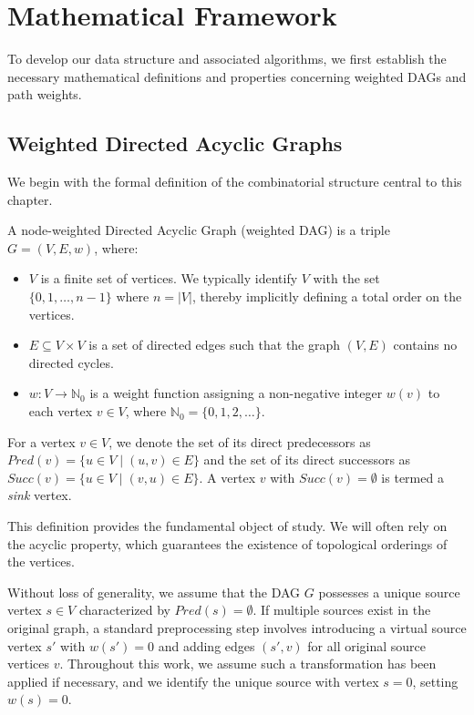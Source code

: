 \section{Mathematical Framework}
\label{sec:dag_defs}

To develop our data structure and associated algorithms, we first establish the necessary mathematical definitions and properties concerning weighted DAGs and path weights.

\subsection*{Weighted Directed Acyclic Graphs}
\label{subsec:dag_def}

We begin with the formal definition of the combinatorial structure central to this chapter.

\begin{definition}
    \label{def:weighted_dag}
    A node-weighted Directed Acyclic Graph (weighted DAG) is a triple $G = (V, E, w)$, where:
    \begin{itemize}
        \item $V$ is a finite set of vertices. We typically identify $V$ with the set $\{0, 1, \dots, n-1\}$ where $n = |V|$, thereby implicitly defining a total order on the vertices.
        \item $E \subseteq V \times V$ is a set of directed edges such that the graph $(V, E)$ contains no directed cycles.
        \item $w: V \to \mathbb{N}_0$ is a weight function assigning a non-negative integer $w(v)$ to each vertex $v \in V$, where $\mathbb{N}_0 = \{0, 1, 2, \dots\}$.
    \end{itemize}
    For a vertex $v \in V$, we denote the set of its direct predecessors as $Pred(v) = \{u \in V \mid (u, v) \in E\}$ and the set of its direct successors as $Succ(v) = \{u \in V \mid (v, u) \in E\}$. A vertex $v$ with $Succ(v) = \emptyset$ is termed a \emph{sink} vertex.
\end{definition}

This definition provides the fundamental object of study. We will often rely on the acyclic property, which guarantees the existence of topological orderings of the vertices.

\begin{assumption}
    \label{ass:unique_source}
    Without loss of generality, we assume that the DAG $G$ possesses a unique source vertex $s \in V$ characterized by $Pred(s) = \emptyset$. If multiple sources exist in the original graph, a standard preprocessing step involves introducing a virtual source vertex $s'$ with $w(s')=0$ and adding edges $(s', v)$ for all original source vertices $v$. Throughout this work, we assume such a transformation has been applied if necessary, and we identify the unique source with vertex $s=0$, setting $w(s)=0$.
\end{assumption}

